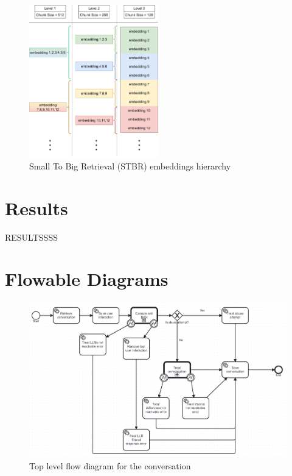 \documentclass[a4paper,12pt,twoside]{ThesisStyle}
\begin{document}
\begin{figure}[htb]
  \centering
  \includegraphics[width=0.5\textwidth]{imatges/Small To Big Retrieval.drawio.png}
  \caption{Small To Big Retrieval (STBR) embeddings hierarchy}
  \label{fig:SmallToBigRetrieval}
\end{figure}

\chapter{Results}
\label{cap:results}

RESULTSSSS

\backmatter

% 





\appendix


\chapter{Flowable Diagrams}
\label{cap:flowable_diagrams}

\begin{figure}[H]
  \centering
  \includegraphics[width=1\textwidth]{imatges/Conversation_process.bpmn20.png}
  \caption{Top level flow diagram for the conversation}
  \label{fig:conversation}
\end{figure}
\end{document}
